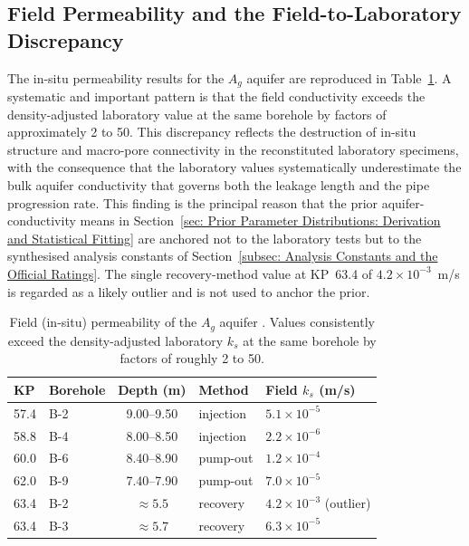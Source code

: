 \subsection{Field Permeability and the Field-to-Laboratory Discrepancy}
\label{subsec: Field Permeability and the Field-to-Laboratory Discrepancy}

The in-situ permeability results for the $A_g$ aquifer are reproduced in Table~\ref{tab:fieldperm}. A systematic and important pattern is that the field conductivity exceeds the density-adjusted laboratory value at the same borehole by factors of approximately 2 to 50. This discrepancy reflects the destruction of in-situ structure and macro-pore connectivity in the reconstituted laboratory specimens, with the consequence that the laboratory values systematically underestimate the bulk aquifer conductivity that governs both the leakage length and the pipe progression rate. This finding is the principal reason that the prior aquifer-conductivity means in Section~\ref{sec: Prior Parameter Distributions: Derivation and Statistical Fitting} are anchored not to the laboratory tests but to the synthesised analysis constants of Section~\ref{subsec: Analysis Constants and the Official Ratings}. The single recovery-method value at KP~63.4 of $4.2\times10^{-3}$~m/s is regarded as a likely outlier and is not used to anchor the prior.

\begin{table}[htbp]
\centering
\footnotesize
\caption{Field (in-situ) permeability of the $A_g$ aquifer \parencite{oyo_1999}. Values consistently exceed the density-adjusted laboratory $k_s$ at the same borehole by factors of roughly 2 to 50.}
\label{tab:fieldperm}
\begin{tabular}{llcll}
\toprule
KP & Borehole & Depth (m) & Method & Field $k_s$ (m/s) \\
\midrule
57.4 & B-2 & 9.00--9.50 & injection  & $5.1\times10^{-5}$ \\
58.8 & B-4 & 8.00--8.50 & injection  & $2.2\times10^{-6}$ \\
60.0 & B-6 & 8.40--8.90 & pump-out   & $1.2\times10^{-4}$ \\
62.0 & B-9 & 7.40--7.90 & pump-out   & $7.0\times10^{-5}$ \\
63.4 & B-2 & $\approx5.5$ & recovery & $4.2\times10^{-3}$ (outlier) \\
63.4 & B-3 & $\approx5.7$ & recovery & $6.3\times10^{-5}$ \\
\bottomrule
\end{tabular}
\end{table}

